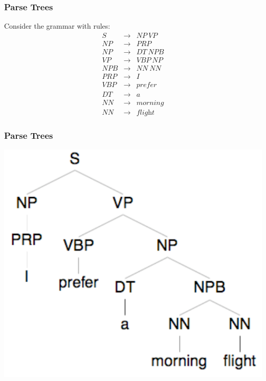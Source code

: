 \begin{frame}
\frametitle{Parse Trees}
\par\noindent
Consider the grammar with rules: 
\begin{eqnarray}
S &\rightarrow& \textit{NP}\ \textit{VP} \nonumber \\
\textit{NP} &\rightarrow& \textit{PRP} \nonumber \\
\textit{NP} &\rightarrow& \textit{DT}\ \textit{NPB} \nonumber \\
\textit{VP} &\rightarrow& \textit{VBP}\ \textit{NP} \nonumber \\
\textit{NPB} &\rightarrow& \textit{NN}\ \textit{NN} \nonumber \\
\textit{PRP} &\rightarrow& \textit{I} \nonumber \\
\textit{VBP} &\rightarrow& \textit{prefer} \nonumber \\
\textit{DT} &\rightarrow& \textit{a} \nonumber \\
\textit{NN} &\rightarrow& \textit{morning} \nonumber \\
\textit{NN} &\rightarrow& \textit{flight} \nonumber
\end{eqnarray}

\end{frame}

\begin{frame}
\frametitle{Parse Trees}

\includegraphics[scale=.5]{figures/cfg2}

\end{frame}

